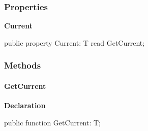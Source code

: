 \documentclass{report}
\newif\ifpdf
\begin{document}
\subsubsection*{\large{\textbf{Properties}}\normalsize\hspace{1ex}\hfill}
\begin{list}{}{
\setlength{\itemindent}{0cm}
\setlength{\listparindent}{0cm}
\setlength{\leftmargin}{\evensidemargin}
\addtolength{\leftmargin}{\tmplength}
\settowidth{\labelsep}{X}
\addtolength{\leftmargin}{\labelsep}
\setlength{\labelwidth}{\tmplength}
}
\label{ok_attributes.IEnumerator-Current}
\item[\textbf{Current}\hfill]
\ifpdf
\begin{flushleft}
\fi
\begin{ttfamily}
public property Current: T read GetCurrent;\end{ttfamily}

\ifpdf
\end{flushleft}
\fi


\par  \end{list}
\subsubsection*{\large{\textbf{Methods}}\normalsize\hspace{1ex}\hfill}
\paragraph*{GetCurrent}\hspace*{\fill}

\label{ok_attributes.IEnumerator-GetCurrent}
\begin{list}{}{
\setlength{\itemindent}{0cm}
\setlength{\listparindent}{0cm}
\setlength{\leftmargin}{\evensidemargin}
\addtolength{\leftmargin}{\tmplength}
\settowidth{\labelsep}{X}
\addtolength{\leftmargin}{\labelsep}
\setlength{\labelwidth}{\tmplength}
}
\item[\textbf{Declaration}\hfill]
\ifpdf
\begin{flushleft}
\fi
\begin{ttfamily}
public function GetCurrent: T;\end{ttfamily}

\ifpdf
\end{flushleft}
\fi

\end{list}
\end{document}
